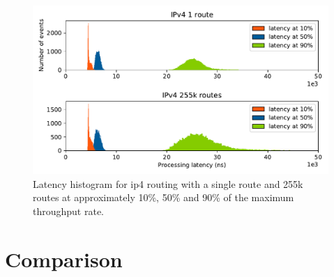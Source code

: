 

\begin{figure}[!ht]
\noindent\hspace{0.5mm}\includegraphics[width=\linewidth]{pics/latency_histogram_overview_ip4.pdf}
\caption{Latency histogram for \Ac{ip4} routing with a single route and 255k routes at approximately 10\%, 50\% and 90\% of the maximum throughput rate. }
\label{graph:latencyhistogram}
\end{figure}





\section{Comparison}

